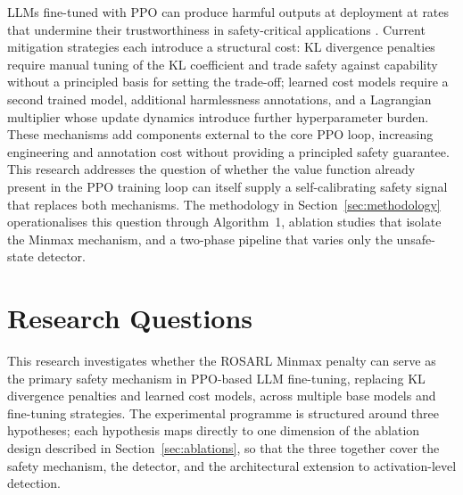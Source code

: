 \documentclass[a4paper,twoside,12pt]{report}
\begin{document}
LLMs fine-tuned with PPO can produce harmful outputs at deployment at rates that undermine
their trustworthiness in safety-critical applications \citep{dai2024saferlhf,
chittepu2025}. Current mitigation strategies each introduce a structural cost: KL
divergence penalties require manual tuning of the KL coefficient and trade safety against
capability without a principled basis for setting the trade-off; learned cost models
require a second trained model, additional harmlessness annotations, and a Lagrangian
multiplier whose update dynamics introduce further hyperparameter burden. These mechanisms
add components external to the core PPO loop, increasing engineering and annotation cost
without providing a principled safety guarantee. This research addresses the question of
whether the value function already present in the PPO training loop can itself supply a
self-calibrating safety signal that replaces both mechanisms. The methodology in
Section~\ref{sec:methodology} operationalises this question through Algorithm~1, ablation
studies that isolate the Minmax mechanism, and a two-phase pipeline that varies only the
unsafe-state detector.

\section{Research Questions}
\label{sec:research-questions}

This research investigates whether the ROSARL Minmax penalty can serve as the primary
safety mechanism in PPO-based LLM fine-tuning, replacing KL divergence penalties and
learned cost models, across multiple base models and fine-tuning strategies. The
experimental programme is structured around three hypotheses; each hypothesis maps
directly to one dimension of the ablation design described in
Section~\ref{sec:ablations}, so that the three together cover the safety mechanism, the
detector, and the architectural extension to activation-level detection.
\end{document}
